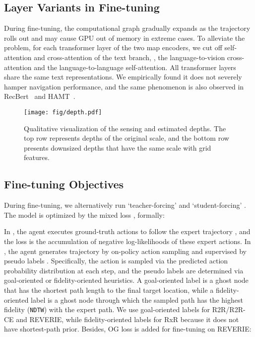 \subsection{Layer Variants in Fine-tuning}
During fine-tuning, the computational graph gradually expands as the trajectory rolls out and may cause GPU out of memory in extreme cases.  
To alleviate the problem, for each transformer layer of the two map encoders, we cut off self-attention and cross-attention of the text branch, \ie, the language-to-vision cross-attention and the language-to-language self-attention. 
All transformer layers share the same text representations. We empirically found it does not severely hamper navigation performance, and the same phenomenon is also observed in RecBert~\cite{hong2021vln} and HAMT~\cite{chen2021history}.

\begin{figure*}[h]
\vspace{-3mm}
\centering
\texttt{[image: fig/depth.pdf]}
\vspace{-3mm}
\caption{
Qualitative visualization of the sensing and estimated depths. The top row represents depths of the original scale, and the bottom row presents downsized depths that have the same scale with grid features.
}\label{fig:depth}
\vspace{-3mm}
\end{figure*}


\subsection{Fine-tuning Objectives}
During fine-tuning, we alternatively run `teacher-forcing'  and `student-forcing' . The model is optimized by the mixed loss , formally:
{\small

}

In , the agent executes ground-truth actions  to follow the expert trajectory , and the loss is the accumulation of negative log-likelihoods of these expert actions.
In , the agent generates trajectory  by on-policy action sampling and supervised by pseudo labels .
Specifically, the action is sampled via the predicted action probability distribution at each step, and the pseudo labels are determined via goal-oriented or fidelity-oriented heuristics. 
A goal-oriented label is a ghost node that has the shortest path length to the final target location, while a fidelity-oriented label is a ghost node through which the sampled path has the highest fidelity (\texttt{NDTW}) with the expert path.
We use goal-oriented labels for R2R/R2R-CE and REVERIE, while fidelity-oriented labels for RxR because it does not have shortest-path prior.
Besides, OG loss is added for fine-tuning on REVERIE:
{\small

}


